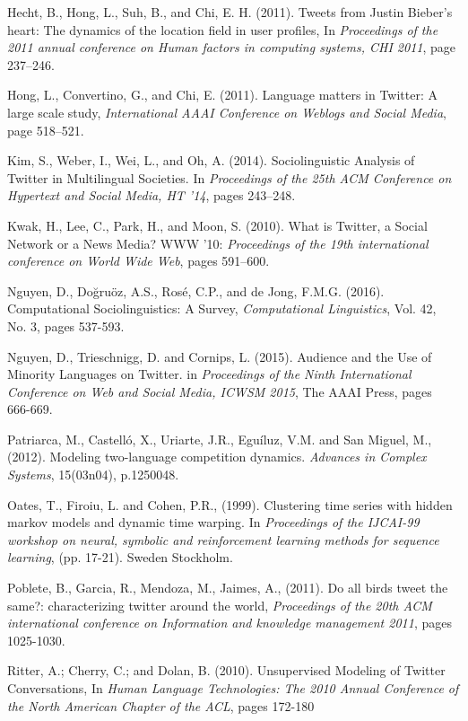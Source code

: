 \documentclass[12pt]{article}
\begin{document}
\begin{thebibliography}{9}
Hecht, B., Hong, L., Suh, B., and Chi, E. H. (2011).
Tweets from Justin Bieber's heart: The dynamics of the location field in user profiles, In \textit{Proceedings of the 2011 annual conference on Human factors in computing systems, CHI 2011}, page 237–246.

 
Hong, L., Convertino, G., and Chi, E. (2011).
Language matters in Twitter: A large scale study, \textit{International AAAI Conference on Weblogs and Social Media}, page 518–521.

Kim, S., Weber, I., Wei, L., and Oh, A. (2014). Sociolinguistic Analysis of Twitter in Multilingual Societies. In \textit{Proceedings of the 25th ACM Conference on Hypertext and Social Media, HT '14}, pages 243–248.

Kwak, H., Lee, C., Park, H., and Moon, S. (2010). What is Twitter, a Social Network or a News Media? WWW '10: \textit{Proceedings of the 19th international conference on World Wide Web}, pages 591–600.

Nguyen, D., Doğruöz, A.S., Rosé, C.P., and de Jong, F.M.G. (2016).
Computational Sociolinguistics: A Survey, \textit{Computational Linguistics}, Vol. 42, No. 3, pages 537-593.

Nguyen, D., Trieschnigg, D. and Cornips, L. (2015). Audience and the Use of Minority Languages on Twitter. in \textit{Proceedings of the Ninth International Conference on Web and Social Media, ICWSM 2015}, The AAAI Press, pages 666-669.

Patriarca, M., Castell\'o, X., Uriarte, J.R., Egu\'iluz, V.M. and San Miguel, M., (2012). Modeling two-language competition dynamics. \textit{Advances in Complex Systems}, 15(03n04), p.1250048.

Oates, T., Firoiu, L. and Cohen, P.R., (1999). Clustering time series with hidden markov models and dynamic time warping. In \textit{Proceedings of the IJCAI-99 workshop on neural, symbolic and reinforcement learning methods for sequence learning}, (pp. 17-21). Sweden Stockholm.

Poblete, B., Garcia, R., Mendoza, M., Jaimes, A., (2011). Do all birds tweet the same?: characterizing twitter around the world, \textit{Proceedings of the 20th ACM international conference on Information and knowledge management 2011}, pages 1025-1030.

Ritter, A.; Cherry, C.; and Dolan, B. (2010). Unsupervised Modeling
of Twitter Conversations, In \textit{Human Language Technologies: The 2010 Annual Conference of the North American Chapter of the ACL}, pages 172-180



\end{thebibliography}
\end{document}

